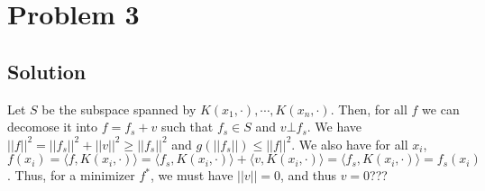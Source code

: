 \documentclass[11pt]{report}
\begin{document}
\section*{Problem 3}
\subsection*{Solution}
Let $S$ be the subspace spanned by $K(x_1,\cdot), \cdots, K(x_n, \cdot)$. Then, for all $f$ we can decomose it into $f = f_s + v$ such that $f_s \in S$ and $v \bot f_s$. We have $||f||^2 = ||f_s||^2 + ||v||^2 \geq ||f_s||^2$ and $g(||f_s||) \leq ||f||^2$. We also have for all $x_i$, $f(x_i) = \langle f,K(x_i,\cdot) \rangle = \langle f_s,K(x_i,\cdot) \rangle + \langle v,K(x_i,\cdot) \rangle = \langle f_s,K(x_i,\cdot) \rangle = f_s(x_i)$. Thus, for a minimizer $f^*$, we must have $||v|| = 0$, and thus $v = 0$???
\end{document}
